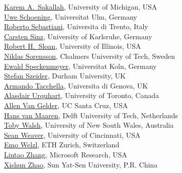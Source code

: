 \documentclass[10pt]{article}
\begin{document}
\begin{minipage}[t]{7.5cm}
{          \href{http://www.eecs.umich.edu/~karem/}{Karem A.\ Sakallah}, University of Michigan, USA  \\
          \href{http://theorie.informatik.uni-ulm.de/Personen/Schoening/index.html}{Uwe Schoening}, Universitat Ulm, Germany   \\
          \href{http://www.dit.unitn.it/~rseba/}{Roberto Sebastiani}, Universita di Trento, Italy  \\
          \href{http://www.carstensinz.de/}{Carsten Sinz}, University of Karlsruhe, Germany \\
          \href{http://www.cs.uic.edu/~sloan/}{Robert H.\ Sloan}, University of Illinois, USA  \\
          \href{http://www.cs.chalmers.se/~nik/}{Niklas Sorensson}, Chalmers University of Tech, Sweden  \\
          \href{http://www.scale.uni-koeln.de/}{Ewald Speckenmeyer}, Universitat Koln, Germany  \\
          \href{http://www.dur.ac.uk/stefan.szeider/}{Stefan Szeider}, Durham University, UK  \\
          \href{http://www.mrg.dist.unige.it/~tac/}{Armando Tacchella}, Universita di Genova, UK  \\
          \href{http://www.philosophy.utoronto.ca/people/~aurquhart}{Alasdair Urquhart}, University of Toronto, Canada\\
          \href{http://www.soe.ucsc.edu/~avg/}{Allen Van Gelder}, UC Santa Cruz, USA  \\
          \href{http://www.st.ewi.tudelft.nl/~maaren/}{Hans van Maaren},  Delft University of Tech, Netherlands  \\
          \href{http://www.cse.unsw.edu.au/~tw/}{Toby Walsh}, University of New South Wales, Australia  \\
          \href{http://www.cs.uc.edu/~weaversa/}{Sean Weaver}, University of Cincinnati, USA  \\
          \href{http://www.inf.ethz.ch/personal/emo/}{Emo Welzl}, ETH Zurich, Switzerland  \\
          \href{http://research.microsoft.com/users/lintaoz/}{Lintao Zhang}, Microsoft Research, USA  \\
          \href{http://logic.sysu.edu.cn/2005/english/PEOPLE/200510/english_277.html}{Xishun Zhao}, Sun Yat-Sen University, P.R. China  \\
}
\end{minipage}
\hspace*{0.35cm}
\end{document}
